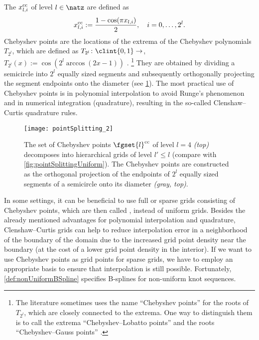 %
The  $x_{l,i}^{\mathrm{cc}}$ of level $l \in \natz$
are defined as
\begin{equation}
  x_{l,i}^{\mathrm{cc}}
  := \frac{1 - \cos(\pi x_{l,i})}{2},\quad
  i = 0, \dotsc, 2^l.
\end{equation}
Chebyshev points are the locations of the extrema of the
Chebyshev polynomials $T_{2^l}$, which are defined as
$T_{2^l}\colon \clint{0, 1} \to \real$,
$T_{2^l}(x) := \cos(2^l \arccos(2x - 1))$ \cite{Xu16Chebyshev}.%
\footnote{%
  The literature sometimes uses the name ``Chebyshev points'' for
  the roots of $T_{2^l}$, which are closely connected to the extrema.
  One way to distinguish them is to call the extrema
  ``Chebyshev--Lobatto points'' and the roots
  ``Chebyshev--Gauss points'' \cite{Xu16Chebyshev}.%
}
They are obtained by dividing a semicircle into $2^l$ equally sized
segments and subsequently orthogonally projecting the
segment endpoints onto the diameter
(see \cref{fig:pointSplittingChebyshev}).
The most practical use of Chebyshev points is in
polynomial interpolation to avoid Runge's phenomenon and in
numerical integration (quadrature), resulting in the
so-called Clenshaw--Curtis quadrature rules.

\begin{figure}
  \texttt{[image: pointSplitting\_2]}%
  \caption{%
    The set of Chebyshev points $\fgset{l}^\clenshawcurtis$ of level
    $l = 4$ \emph{(top)}
    decomposes into hierarchical grids of level $l' \le l$
    (compare with \cref{fig:pointSplittingUniform}).
    The Chebyshev points are constructed as
    the orthogonal projection of the
    endpoints of $2^l$ equally sized segments
    of a semicircle onto its diameter \emph{\textcolor{C8}{(gray, top)}}.%
  }
  \label{fig:pointSplittingChebyshev}
\end{figure}

In some settings, it can be beneficial to use full or sparse grids consisting
of Chebyshev points, which are then called ,
instead of uniform grids.
Besides the already mentioned advantages for polynomial interpolation and
quadrature, Clenshaw--Curtis grids can help to reduce interpolation
error in a neighborhood of the boundary of the domain due to the increased
grid point density near the boundary
(at the cost of a lower grid point density in the interior).
If we want to use Chebyshev points as grid points for sparse grids,
we have to employ an appropriate basis to ensure that interpolation
is still possible.
Fortunately, \cref{def:nonUniformBSpline} specifies B-splines for non-uniform
knot sequences.

